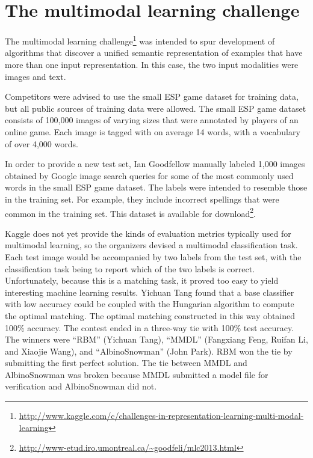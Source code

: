 \documentclass{llncs}
\begin{document}
\section{The multimodal learning challenge}

The multimodal learning challenge\footnote{\tiny{\url{http://www.kaggle.com/c/challenges-in-representation-learning-multi-modal-learning}}}
was intended to spur development of algorithms that discover a unified
semantic representation of examples that have more than one input representation. In this case,
the two input modalities were images and text.


Competitors were advised to use the small ESP game dataset \citep{vonAhn2004} for training data,
but all public sources of training data were allowed. The small ESP game dataset consists of 100,000
images of varying sizes that were annotated by players of an online game. Each image is tagged with
on average 14 words, with a vocabulary of over 4,000 words.

In order to provide a new test set, Ian Goodfellow manually labeled 1,000 images obtained by Google
image search queries for some of the most commonly used words in the small ESP game dataset. The
labels were intended to resemble those in the training set. For example, they include incorrect
spellings that were common in the training set. This dataset is available for download\footnote{\tiny{\url{http://www-etud.iro.umontreal.ca/~goodfeli/mlc2013.html}}}.


Kaggle does not yet provide the kinds of evaluation metrics typically used for multimodal learning, so
the organizers devised a multimodal classification task. Each test image would be accompanied by two labels
from the test set, with the classification task being to report which of the two labels is
correct. Unfortunately, because this is a matching task, it proved too easy to yield interesting
machine learning results. Yichuan Tang found that a base classifier with low accuracy could be coupled
with the Hungarian algorithm to compute the optimal matching. The optimal matching constructed in
this way obtained 100\% accuracy.
The contest ended in a three-way tie with 100\% test accuracy. The winners were ``RBM'' (Yichuan Tang),
``MMDL'' \citep{Feng-wkshp-2013} (Fangxiang Feng, Ruifan Li, and Xiaojie Wang), and ``AlbinoSnowman'' (John Park). RBM won the
tie by submitting the first perfect solution. The tie between MMDL and AlbinoSnowman was broken
because MMDL submitted a model file for verification and AlbinoSnowman did not.
\end{document}
